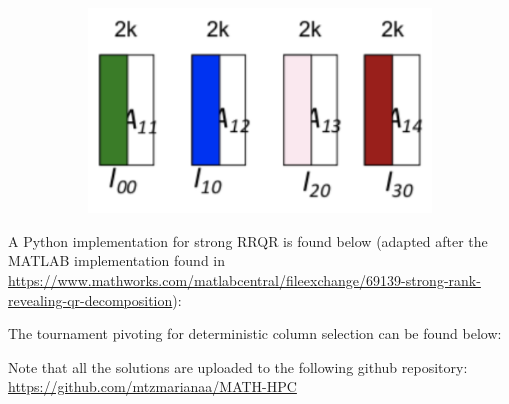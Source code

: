 \documentclass[11pt]{article}
\begin{document}
\begin{figure}[H]
     \centering
     \begin{subfigure}[b]{0.5\textwidth}
         \centering
         \includegraphics[width=\textwidth]{../figures/pivot.png}
     \end{subfigure}
\end{figure}

A Python implementation for strong RRQR is found below (adapted after the MATLAB implementation found in \url{https://www.mathworks.com/matlabcentral/fileexchange/69139-strong-rank-revealing-qr-decomposition}):



The tournament pivoting for deterministic column selection can be found below:



Note that all the solutions are uploaded to the following github repository: \url{https://github.com/mtzmarianaa/MATH-HPC}
\end{document}
